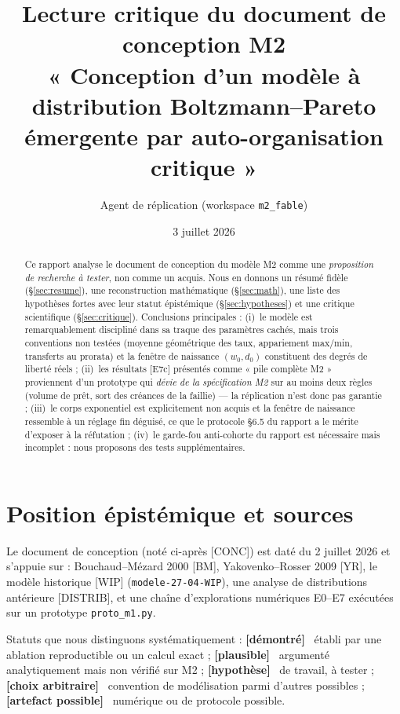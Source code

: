\documentclass[11pt,a4paper]{article}
\title{Lecture critique du document de conception M2\\
\large « Conception d'un modèle à distribution Boltzmann--Pareto émergente
par auto-organisation critique »}
\author{Agent de réplication (workspace \texttt{m2\_fable})}
\date{3 juillet 2026}
\newcommand{\demontre}[1]{\textbf{[démontré]}~#1}
\newcommand{\plausible}[1]{\textbf{[plausible]}~#1}
\newcommand{\hypothese}[1]{\textbf{[hypothèse]}~#1}
\newcommand{\arbitraire}[1]{\textbf{[choix arbitraire]}~#1}
\newcommand{\artefact}[1]{\textbf{[artefact possible]}~#1}
\begin{document}
\maketitle

\begin{abstract}
Ce rapport analyse le document de conception du modèle M2 comme une
\emph{proposition de recherche à tester}, non comme un acquis. Nous en donnons
un résumé fidèle (\S\ref{sec:resume}), une reconstruction mathématique
(\S\ref{sec:math}), une liste des hypothèses fortes avec leur statut
épistémique (\S\ref{sec:hypotheses}) et une critique scientifique
(\S\ref{sec:critique}). Conclusions principales : (i)~le modèle est
remarquablement discipliné dans sa traque des paramètres cachés, mais trois
conventions non testées (moyenne géométrique des taux, appariement
max/min, transferts au prorata) et la fenêtre de naissance
$(w_0, d_0)$ constituent des degrés de liberté réels ; (ii)~les résultats
[E7c] présentés comme « pile complète M2 » proviennent d'un prototype qui
\emph{dévie de la spécification M2} sur au moins deux règles (volume de prêt,
sort des créances de la faillie) — la réplication n'est donc pas garantie ;
(iii)~le corps exponentiel est explicitement non acquis et la fenêtre de
naissance ressemble à un réglage fin déguisé, ce que le protocole §6.5 du
rapport a le mérite d'exposer à la réfutation ; (iv)~le garde-fou anti-cohorte
du rapport est nécessaire mais incomplet : nous proposons des tests
supplémentaires.
\end{abstract}

\tableofcontents

\section{Position épistémique et sources}

Le document de conception (noté ci-après [CONC]) est daté du 2 juillet 2026 et
s'appuie sur : Bouchaud--Mézard 2000 [BM], Yakovenko--Rosser 2009 [YR], le
modèle historique [WIP] (\texttt{modele-27-04-WIP}), une analyse de
distributions antérieure [DISTRIB], et une chaîne d'explorations numériques
E0--E7 exécutées sur un prototype \texttt{proto\_m1.py}.

Statuts que nous distinguons systématiquement :
\demontre{} établi par une ablation reproductible ou un calcul exact ;
\plausible{} argumenté analytiquement mais non vérifié sur M2 ;
\hypothese{} de travail, à tester ;
\arbitraire{} convention de modélisation parmi d'autres possibles ;
\artefact{} numérique ou de protocole possible.
\end{document}
